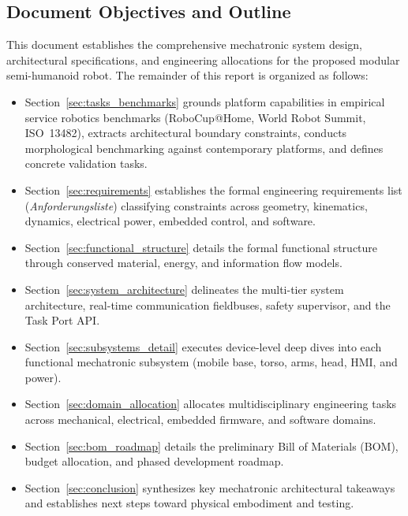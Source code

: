 \subsection{Document Objectives and Outline}
This document establishes the comprehensive mechatronic system design, architectural specifications, and engineering allocations for the proposed modular semi-humanoid robot. The remainder of this report is organized as follows:
\begin{itemize}[leftmargin=1.5em]
  \item Section~\ref{sec:tasks_benchmarks} grounds platform capabilities in empirical service robotics benchmarks (RoboCup@Home, World Robot Summit, ISO~13482), extracts architectural boundary constraints, conducts morphological benchmarking against contemporary platforms, and defines concrete validation tasks.
  \item Section~\ref{sec:requirements} establishes the formal engineering requirements list (\emph{Anforderungsliste}) classifying constraints across geometry, kinematics, dynamics, electrical power, embedded control, and software.
  \item Section~\ref{sec:functional_structure} details the formal functional structure through conserved material, energy, and information flow models.
  \item Section~\ref{sec:system_architecture} delineates the multi-tier system architecture, real-time communication fieldbuses, safety supervisor, and the Task Port API.
  \item Section~\ref{sec:subsystems_detail} executes device-level deep dives into each functional mechatronic subsystem (mobile base, torso, arms, head, HMI, and power).
  \item Section~\ref{sec:domain_allocation} allocates multidisciplinary engineering tasks across mechanical, electrical, embedded firmware, and software domains.
  \item Section~\ref{sec:bom_roadmap} details the preliminary Bill of Materials (BOM), budget allocation, and phased development roadmap.
  \item Section~\ref{sec:conclusion} synthesizes key mechatronic architectural takeaways and establishes next steps toward physical embodiment and testing.
\end{itemize}
